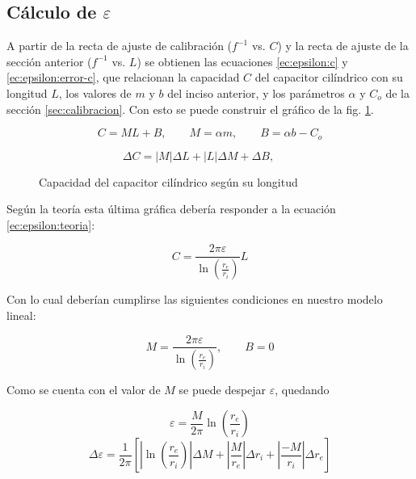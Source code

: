 \subsection{Cálculo de $\varepsilon$}

A partir de la recta de ajuste de calibración ($f^{-1}$ vs. $C$) y la recta de
ajuste de la sección anterior ($f^{-1}$ vs. $L$) se obtienen las ecuaciones
\ref{ec:epsilon:c} y \ref{ec:epsilon:error-c}, que relacionan la capacidad $C$
del capacitor cilíndrico con su longitud $L$, los valores de $m$ y $b$ del
inciso anterior, y los parámetros $\alpha$ y $C_o$ de la sección
\ref{sec:calibracion}. Con esto se puede construir el gráfico de la fig.
\ref{fig:epsilon:cvsl}.

\begin{equation}
    \label{ec:epsilon:c}
    C = ML + B,\quad\quad
    M = \alpha m, \quad\quad
    B = \alpha b - C_o
\end{equation}

\begin{equation}
    \label{ec:epsilon:error-c}
    \Delta C = \left| M \right| \Delta L 
             + \left| L \right| \Delta M
             + \Delta B, \quad\quad
\end{equation}

\begin{figure}[H]
    \centering
    
    \caption{Capacidad del capacitor cilíndrico según su longitud}
    \label{fig:epsilon:cvsl}
\end{figure}

\vspace{10mm}
Según la teoría esta última gráfica debería responder a la ecuación 
\ref{ec:epsilon:teoria}:

\begin{equation}
    \label{ec:epsilon:teoria}
    C = \frac{2\pi\varepsilon}{\ln\left(\frac{r_e}{r_i}\right)} L
\end{equation}

\vspace{5mm}
Con lo cual deberían cumplirse las siguientes condiciones en nuestro modelo
lineal:

\[
    M = \frac{2\pi\varepsilon}{\ln\left(\frac{r_e}{r_i}\right)}, 
    \quad\quad B = 0
\]

\vspace{5mm}
Como se cuenta con el valor de $M$ se puede despejar $\varepsilon$, quedando

\begin{equation}
    \label{ec:epsilon:epsilon}
    \varepsilon = \frac{M}{2\pi} \ln \left(\frac{r_e}{r_i}\right)
\end{equation}
\vspace{5mm}
\begin{equation}
    \label{ec:epsilon:error-epsilon}
    \Delta \varepsilon = \frac{1}{2\pi} \left[ 
            \left| \ln\left(\frac{r_e}{r_i}\right) \right| \Delta M +
            \left| \frac{M}{r_e} \right| \Delta r_i + 
            \left| \frac{-M}{r_i} \right| \Delta r_e
        \right]
\end{equation}

